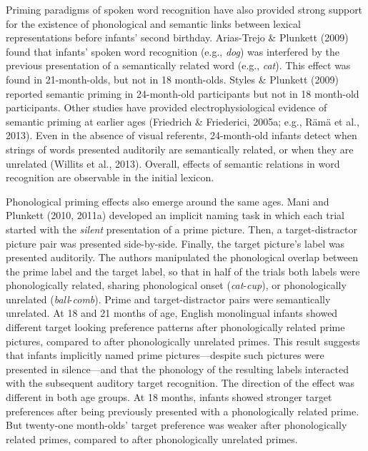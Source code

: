 \documentclass[
  12pt,
  b5paperpaper,
  twoside]{scrreprt}
\begin{document}
Priming paradigms of spoken word recognition have also provided strong
support for the existence of phonological and semantic links between
lexical representations before infants' second birthday. Arias-Trejo \&
Plunkett (2009) found that infants' spoken word recognition (e.g.,
\emph{dog}) was interfered by the previous presentation of a
semantically related word (e.g., \emph{cat}). This effect was found in
21-month-olds, but not in 18 month-olds. Styles \& Plunkett (2009)
reported semantic priming in 24-month-old participants but not in 18
month-old participants. Other studies have provided electrophysiological
evidence of semantic priming at earlier ages (Friedrich \& Friederici,
2005a; e.g., Rämä et al., 2013). Even in the absence of visual
referents, 24-month-old infants detect when strings of words presented
auditorily are semantically related, or when they are unrelated (Willits
et al., 2013). Overall, effects of semantic relations in word
recognition are observable in the initial lexicon.

Phonological priming effects also emerge around the same ages. Mani and
Plunkett (2010, 2011a) developed an implicit naming task in which each
trial started with the \emph{silent} presentation of a prime picture.
Then, a target-distractor picture pair was presented side-by-side.
Finally, the target picture's label was presented auditorily. The
authors manipulated the phonological overlap between the prime label and
the target label, so that in half of the trials both labels were
phonologically related, sharing phonological onset
(\emph{cat}-\emph{cup}), or phonologically unrelated
(\emph{ball}-\emph{comb}). Prime and target-distractor pairs were
semantically unrelated. At 18 and 21 months of age, English monolingual
infants showed different target looking preference patterns after
phonologically related prime pictures, compared to after phonologically
unrelated primes. This result suggests that infants implicitly named
prime pictures---despite such pictures were presented in silence---and
that the phonology of the resulting labels interacted with the
subsequent auditory target recognition. The direction of the effect was
different in both age groups. At 18 months, infants showed stronger
target preferences after being previously presented with a
phonologically related prime. But twenty-one month-olds' target
preference was weaker after phonologically related primes, compared to
after phonologically unrelated primes.
\end{document}
